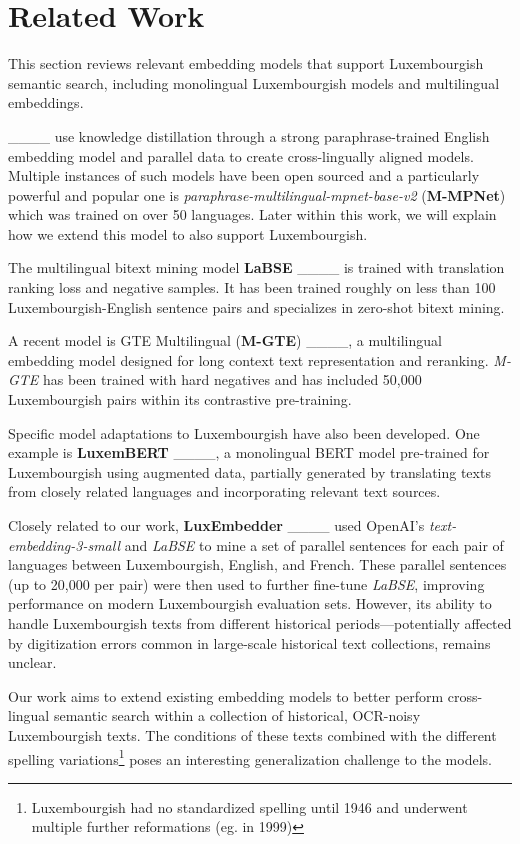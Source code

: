 \section{Related Work}
This section reviews relevant embedding models that support Luxembourgish semantic search, including monolingual Luxembourgish models and multilingual embeddings.


____ use knowledge distillation through a strong paraphrase-trained English embedding model and parallel data to create cross-lingually aligned models. Multiple instances of such models have been open sourced and a particularly powerful and popular one is \textit{paraphrase-multilingual-mpnet-base-v2} (\textbf{M-MPNet}) which was trained on over 50 languages. Later within this work, we will explain how we extend this model to also support Luxembourgish.

The multilingual bitext mining model \textbf{LaBSE} ____ is trained with translation ranking loss and negative samples.  It has been trained roughly on less than 100 Luxembourgish-English sentence pairs and specializes in zero-shot bitext mining. 

A recent model is GTE Multilingual (\textbf{M-GTE}) ____, a multilingual embedding model designed for long context text representation and reranking.  \textit{M-GTE} has been trained with hard negatives and has included 50,000 Luxembourgish pairs within its contrastive pre-training.

Specific model adaptations to Luxembourgish have also been developed. One example is \textbf{LuxemBERT} ____, a monolingual BERT model pre-trained for Luxembourgish using augmented data, partially generated by translating texts from closely related languages and incorporating relevant text sources. 

Closely related to our work, \textbf{LuxEmbedder} ____ used OpenAI's \textit{text-embedding-3-small} and \textit{LaBSE} to mine a set of parallel sentences for each pair of languages between Luxembourgish, English, and French. These parallel sentences (up to 20,000 per pair) were then used to further fine-tune \textit{LaBSE}, improving performance on modern Luxembourgish evaluation sets. However, its ability to handle Luxembourgish texts from different historical periods---potentially affected by digitization errors common in large-scale historical text collections, remains unclear.

Our work aims to extend existing embedding models to better perform cross-lingual semantic search within a collection of historical, OCR-noisy Luxembourgish texts. The conditions of these texts combined with the different spelling variations\footnote{Luxembourgish had no standardized spelling until 1946 and underwent multiple further reformations (eg. in 1999)} poses an interesting generalization challenge to the models.